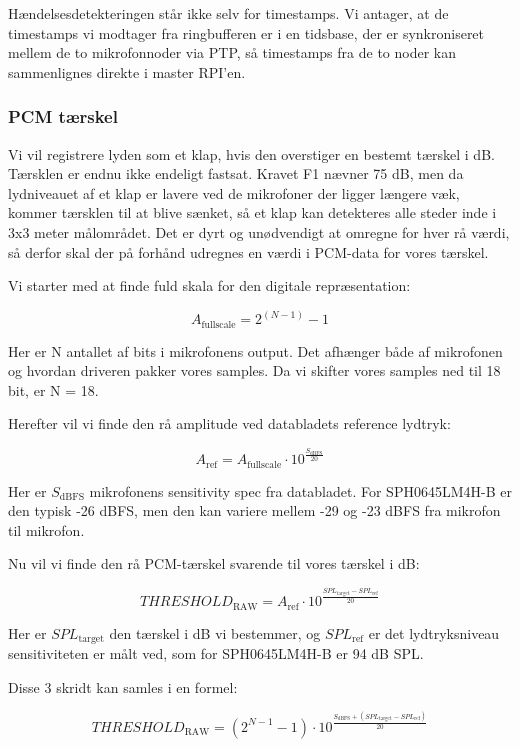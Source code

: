 \documentclass[
  danish,
]{article}
\begin{document}
Hændelsesdetekteringen står ikke selv for timestamps. Vi antager, at de
timestamps vi modtager fra ringbufferen er i en tidsbase, der er
synkroniseret mellem de to mikrofonnoder via PTP, så timestamps fra de
to noder kan sammenlignes direkte i master RPI'en.

\subsubsection{PCM tærskel}\label{pcm-tuxe6rskel}

Vi vil registrere lyden som et klap, hvis den overstiger en bestemt
tærskel i dB. Tærsklen er endnu ikke endeligt fastsat. Kravet F1 nævner
75 dB, men da lydniveauet af et klap er lavere ved de mikrofoner der
ligger længere væk, kommer tærsklen til at blive sænket, så et klap kan
detekteres alle steder inde i 3x3 meter målområdet. Det er dyrt og
unødvendigt at omregne for hver rå værdi, så derfor skal der på forhånd
udregnes en værdi i PCM-data for vores tærskel.

Vi starter med at finde fuld skala for den digitale repræsentation:

\[A_{\mathrm{fullscale}} = 2^{(N - 1)} - 1\]

Her er N antallet af bits i mikrofonens output. Det afhænger både af
mikrofonen og hvordan driveren pakker vores samples. Da vi skifter vores
samples ned til 18 bit, er N = 18.

Herefter vil vi finde den rå amplitude ved databladets reference
lydtryk:

\[A_{\mathrm{ref}} = A_{\mathrm{fullscale}} \cdot 10^{\frac{S_{\mathrm{dBFS}}}{20}}\]

Her er \(S_{\mathrm{dBFS}}\) mikrofonens sensitivity spec fra databladet. For
SPH0645LM4H-B er den typisk -26 dBFS, men den kan variere mellem -29 og
-23 dBFS fra mikrofon til mikrofon.

Nu vil vi finde den rå PCM-tærskel svarende til vores tærskel i dB:

\[\mathit{THRESHOLD}_{\mathrm{RAW}} = A_{\mathrm{ref}} \cdot 10^{\frac{\mathit{SPL}_{\mathrm{target}} - \mathit{SPL}_{\mathrm{ref}}}{20}}\]

Her er \(\mathit{SPL}_{\mathrm{target}}\) den tærskel i dB vi bestemmer, og \(\mathit{SPL}_{\mathrm{ref}}\)
er det lydtryksniveau sensitiviteten er målt ved, som for SPH0645LM4H-B
er 94 dB SPL.

Disse 3 skridt kan samles i en formel:

\[\mathit{THRESHOLD}_{\mathrm{RAW}} = (2^{N - 1} - 1) \cdot 10^{\frac{S_{\mathrm{dBFS}} + (\mathit{SPL}_{\mathrm{target}} - \mathit{SPL}_{\mathrm{ref}})}{20}}\]
\end{document}

